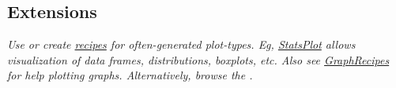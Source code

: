 \subsection*{Extensions}
\textit{Use or create \href{http://docs.juliaplots.org/latest/recipes/\#recipes-1}{recipes} for often-generated plot-types. Eg, \href{https://github.com/JuliaPlots/StatsPlots.jl}{StatsPlot} allows visualization of data frames, distributions, boxplots, etc. Also see \href{https://github.com/JuliaPlots/GraphRecipes.jl}{GraphRecipes} for help plotting graphs. Alternatively, browse the .}


\\
 \\ 
  \\

